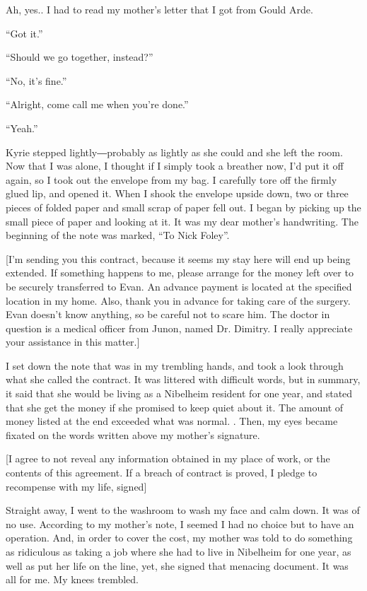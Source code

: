 \documentclass[oneside]{book}
\begin{document}
Ah, yes.. I had to read my mother’s letter that I got from Gould Arde.

“Got it.”

“Should we go together, instead?”

“No, it’s fine.”

“Alright, come call me when you’re done.”

“Yeah.”

Kyrie stepped lightly―probably as lightly as she could and she left the room. Now that I was alone, I thought if I simply took a breather now, I’d put it off again, so I took out the envelope from my bag. I carefully tore off the firmly glued lip, and opened it. When I shook the envelope upside down, two or three pieces of folded paper and small scrap of paper fell out. I began by picking up the small piece of paper and looking at it. It was my dear mother’s handwriting. The beginning of the note was marked, “To Nick Foley”.

[I’m sending you this contract, because it seems my stay here will end up being extended. If something happens to me, please arrange for the money left over to be securely transferred to Evan. An advance payment is located at the specified location in my home. Also, thank you in advance for taking care of the surgery. Evan doesn’t know anything, so be careful not to scare him. The doctor in question is a medical officer from Junon, named Dr. Dimitry. I really appreciate your assistance in this matter.]

I set down the note that was in my trembling hands, and took a look through what she called the contract. It was littered with difficult words, but in summary, it said that she would be living as a Nibelheim resident for one year, and stated that she get the money if she promised to keep quiet about it. The amount of money listed at the end exceeded what was normal. . Then, my eyes became fixated on the words written above my mother’s signature.

[I agree to not reveal any information obtained in my place of work, or the contents of this agreement. If a breach of contract is proved, I pledge to recompense with my life, signed]

Straight away, I went to the washroom to wash my face and calm down. It was of no use. According to my mother’s note, I seemed I had no choice but to have an operation. And, in order to cover the cost, my mother was told to do something as ridiculous as taking a job where she had to live in Nibelheim for one year, as well as put her life on the line, yet, she signed that menacing document. It was all for me. My knees trembled.
\end{document}
